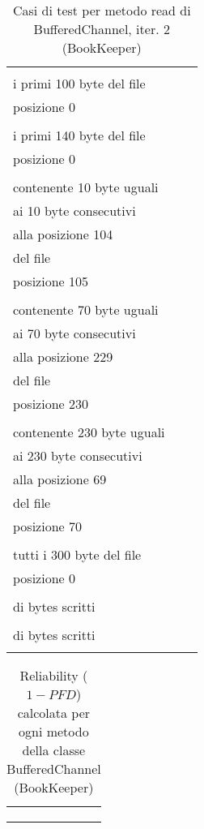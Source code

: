 \documentclass[10pt, a4paper]{article}
\newcommand{\Intmaketable}[4]{
	\begin{longtable}{#3}
	#4
	\caption{#2}
	\label{#1}
	\end{longtable}
}
\newcommand{\Inttestctable}[3]{
	\Intmaketable{#1}{#2}{|l|l|l|}{
	\hline
	\thead{Input} & \thead{Esito atteso} & \thead{Motivazione}\\
	\hline
	\hline
	#3
	\hline}
}
\newcommand{\Intreltable}[3]{
	\Intmaketable{#1}{#2}{|l|l|l|l|l|l|l|}{
	\hline
	\thead{Metodo} & \thead{\# test totali} & \thead{\# test pass.} & \thead{\# test fail.} & \thead{Rif. num. tab. prof. op.} &
	\thead{Distribuzione} & \thead{Reliability}\\
	\hline
	\hline
	#3
	\hline}
}
\newcommand{\Inttestccaption}[4]{Casi di test per metodo #1 di #2, iter. #3 (#4)}
\newcommand{\Intrelcaption}[2]{Reliability ($1-PFD$) calcolata per ogni metodo della classe #1 (#2)}
\newcommand{\gettablelabel}[5]{table:#1:#2:#3:iter#4:proj#5}
\newcommand{\getreltablelabel}[2]{\gettablelabel{#1}{}{}{}{#2}}
\newcommand{\testctable}[5]{
	\Inttestctable{\gettablelabel{testc}{#1}{#2}{#3}{#4}}
		{\Inttestccaption{#1}{#2}{#3}{#4}}
		{#5}
}
\newcommand{\reltable}[3] {
	\Intreltable{\getreltablelabel{#1}{#2}}
		{\Intrelcaption{#1}{#2}}
		{#3}
}
\newcommand{\unifdist}[1]{Uniforme: $#1$}
\newcommand{\tcell}{\makecell[tl]}
\newcommand{\newtrow}{\\ \hline}
\def\bookkeeper{BookKeeper}
\begin{document}
	\testctable{read}{BufferedChannel}{2}{\bookkeeper}{
			\tcell{ByteBuf(), 0, 100} &
			\tcell{Buffer destinazione contenente\\
					i primi 100 byte del file} &
			\tcell{Lettura di 100 byte dalla\\posizione 0}
		\newtrow
			\tcell{ByteBuf(), 0, 140} &
			\tcell{Buffer destinazione contenente\\
					i primi 140 byte del file} &
			\tcell{Lettura di 140 byte dalla\\posizione 0}
		\newtrow
			\tcell{ByteBuf(), 105, 10} & 
			\tcell{Buffer destinazione\\ 
				contenente 10 byte uguali\\ 
				ai 10 byte consecutivi\\
				alla posizione 104\\ 
				del file} &
			\tcell{Lettura di 10 byte dalla\\posizione 105}
		\newtrow
			\tcell{ByteBuf(), 230, 70} & 
			\tcell{Buffer destinazione\\ 
				contenente 70 byte uguali\\ 
				ai 70 byte consecutivi\\
				alla posizione 229\\ 
				del file} &
			\tcell{Lettura di 70 byte dalla\\posizione 230}
		\newtrow
			\tcell{ByteBuf(), 70, 230} & 
			\tcell{Buffer destinazione\\ 
				contenente 230 byte uguali\\ 
				ai 230 byte consecutivi\\
				alla posizione 69\\ 
				del file} &
			\tcell{Lettura di 230 byte dalla\\posizione 70}
		\newtrow
			\tcell{ByteBuf(), 0, 300} &
			\tcell{Buffer destinazione contenente\\
					tutti i 300 byte del file} &
			\tcell{Lettura di 300 byte dalla\\posizione 0}
		\newtrow
			\tcell{ByteBuf(), 0, 301} &
			\tcell{IOException viene lanciata} &
			\tcell{
					La lettura eccede il numero\\
					di bytes scritti}
		\newtrow
			\tcell{ByteBuf(), 300, 1} &
			\tcell{IOException viene lanciata} &
			\tcell{
					La lettura eccede il numero\\
					di bytes scritti}
		\newtrow
	}
	
	\reltable{BufferedChannel}{\bookkeeper}{
			\tcell{write} &
			\tcell{$12$} &
			\tcell{$12$} &
			\tcell{$0$} & 
			\tcell{
				tabella $\ref{\gettablelabel{testc}{write}{BufferedChannel}{1}{\bookkeeper}}$,
				tabella $\ref{\gettablelabel{testc}{write}{BufferedChannel}{2}{\bookkeeper}}$} &
			\tcell{\unifdist{0.083}} &
			\tcell{$1$}
		\newtrow	
			\tcell{read} &
			\tcell{$21$} &
			\tcell{$15$} &
			\tcell{$6$} &
			\tcell{
				tabella $\ref{\gettablelabel{testc}{read}{BufferedChannel}{1}{\bookkeeper}}$,
				tabella $\ref{\gettablelabel{testc}{read}{BufferedChannel}{2}{\bookkeeper}}$} &
			\tcell{\unifdist{0.048}} &
			\tcell{$0.7$}
		\newtrow
	}
	
	
\end{document}
